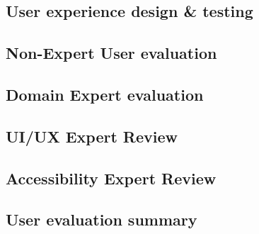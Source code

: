 \documentclass[preview]{standalone}
\begin{document}
\subsection{User experience design \& testing}


\newpage{}
\subsection{Non-Expert User evaluation}


\newpage{}
\subsection{Domain Expert evaluation}


\newpage{}
\subsection{UI/UX Expert Review}


\newpage{}
\subsection{Accessibility Expert Review}


\newpage{}
\subsection{User evaluation summary}

\end{document}
